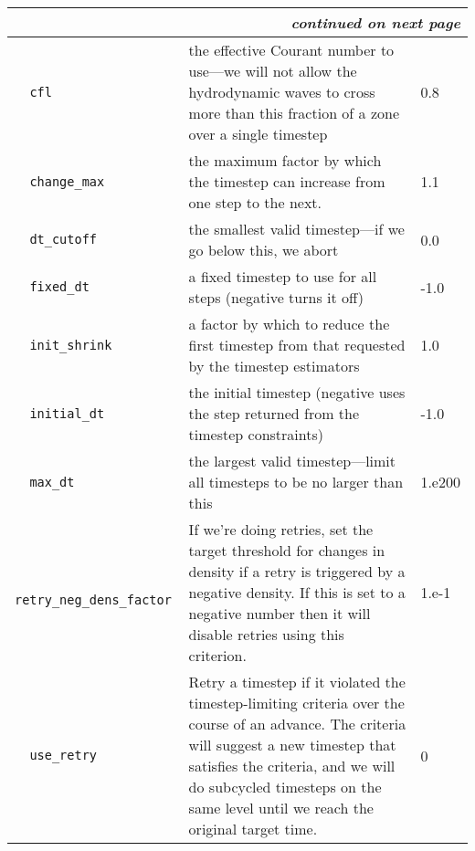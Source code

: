 \begin{landscape}
{\begin{center}
\begin{longtable}{|l|p{5.25in}|l|}
\multicolumn{3}{|r|}{{\em continued on next page}} \\ \hline
\endfoot

\hline 
\endlastfoot


\rowcolor{tableShade}
\verb=  cfl  = &   the effective Courant number to use---we will not allow the hydrodynamic waves to cross more than this fraction of a zone over a single timestep  &  0.8 \\
\verb=  change_max  = &   the maximum factor by which the timestep can increase from one step to the next.  &  1.1 \\
\rowcolor{tableShade}
\verb=  dt_cutoff  = &   the smallest valid timestep---if we go below this, we abort  &  0.0 \\
\verb=  fixed_dt  = &   a fixed timestep to use for all steps (negative turns it off)  &  -1.0 \\
\rowcolor{tableShade}
\verb=  init_shrink  = &   a factor by which to reduce the first timestep from that requested by the timestep estimators  &  1.0 \\
\verb=  initial_dt  = &   the initial timestep (negative uses the step returned from the timestep constraints)  &  -1.0 \\
\rowcolor{tableShade}
\verb=  max_dt  = &   the largest valid timestep---limit all timesteps to be no larger than this  &  1.e200 \\
\verb=  retry_neg_dens_factor  = &   If we're doing retries, set the target threshold for changes in density if a retry is triggered by a negative density. If this is set to a negative number then it will disable retries using this criterion.  &  1.e-1 \\
\rowcolor{tableShade}
\verb=  use_retry  = &   Retry a timestep if it violated the timestep-limiting criteria over the course of an advance. The criteria will suggest a new timestep that satisfies the criteria, and we will do subcycled timesteps on the same level until we reach the original target time.  &  0 \\


\end{longtable}
\end{center}

} %


\end{landscape}

%


